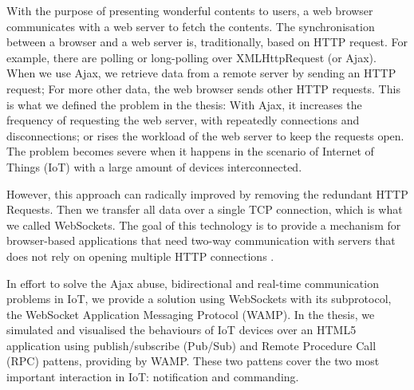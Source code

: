 With the purpose of presenting wonderful contents to users, a web browser communicates with a web server to fetch the contents. The synchronisation between a browser and a web server is, traditionally, based on HTTP request. For example, there are polling or long-polling over XMLHttpRequest (or Ajax). When we use Ajax, we retrieve data from a remote server by sending an HTTP request; For more other data, the web browser sends other HTTP requests. This is what we defined the problem in the thesis: With Ajax, it increases the frequency of requesting the web server, with repeatedly connections and disconnections; or rises the workload of the web server to keep the requests open. The problem becomes severe when it happens in the scenario of Internet of Things (IoT) with a large amount of devices interconnected.

However, this approach can radically improved by removing the redundant HTTP Requests. Then we transfer all data over a single TCP connection, which is what we called WebSockets. The goal of this technology is to provide a mechanism for browser-based applications that need two-way communication with servers that does not rely on opening multiple HTTP connections \cite{rfc64552012web}.

In effort to solve the Ajax abuse, bidirectional and real-time communication problems in IoT, we provide a solution using WebSockets with its subprotocol, the WebSocket Application Messaging Protocol (WAMP). In the thesis, we simulated and visualised the behaviours of IoT devices over an HTML5 application using publish/subscribe (Pub/Sub) and Remote Procedure Call (RPC) pattens, providing by WAMP. These two pattens cover the two most important interaction in IoT: notification and commanding.